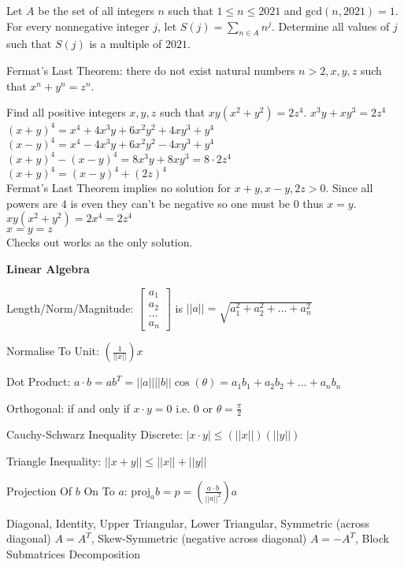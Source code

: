 Let $A$ be the set of all integers $n$ such that $1 \le n \le 2021$ and $\text{gcd}(n,2021)=1$. For every nonnegative integer $j$, let $S(j)=\sum_{n \in A}n^j$. Determine all values of $j$ such that $S(j)$ is a multiple of $2021$.

Fermat's Last Theorem: there do not exist natural numbers $n>2,x,y,z$ such that $x^n+y^n=z^n$.

Find all positive integers $x,y,z$ such that $xy(x^2+y^2)=2z^4$.
$x^3 y + x y^3 = 2 z^4$ \\
$(x+y)^4 = x^4 + 4 x^3 y + 6 x^2 y^2 + 4 x y^3 + y^4$ \\
$(x-y)^4 = x^4 - 4 x^3 y + 6 x^2 y^2 - 4 x y^3 + y^4$ \\
$(x+y)^4-(x-y)^4 = 8 x^3 y + 8 x y^3 = 8 \cdot 2 z^4$ \\
$(x+y)^4 = (x-y)^4 + (2z)^4$ \\
Fermat's Last Theorem implies no solution for $x+y,x-y,2z > 0$. Since all powers are $4$ is even they can't be negative so one must be $0$ thus $x=y$.
$xy(x^2+y^2)=2x^4=2z^4$ \\
$x=y=z$ \\
Checks out works as the only solution.

\newpage

\textbf{Linear Algebra}

Length/Norm/Magnitude: $\begin{bmatrix} a_1 \\ a_2 \\ \dots \\ a_n \end{bmatrix}$ is $||a|| = \sqrt{a_1^2 + a_2^2 + \dots + a_n^2}$

Normalise To Unit: $\left( \frac{1}{||x||} \right) x$

Dot Product: $a \cdot b = a b^{T} = ||a|| ||b|| \cos(\theta) = a_1 b_1 + a_2 b_2 + \dots + a_n b_n$

Orthogonal: if and only if $x \cdot y =0$ i.e. $0$ or $\theta = \frac{\pi}{2}$

Cauchy-Schwarz Inequality Discrete: $|x \cdot y| \le (||x||)(||y||)$

Triangle Inequality: $||x+y|| \le ||x|| + ||y||$

Projection Of $b$ On To $a$: $\text{proj}_a b = p = \left(\frac{a \cdot b}{||a||^2} \right) a$

Diagonal, Identity, Upper Triangular, Lower Triangular, Symmetric (across diagonal) $A=A^T$, Skew-Symmetric (negative across diagonal) $A=-A^T$, Block Submatrices Decomposition

